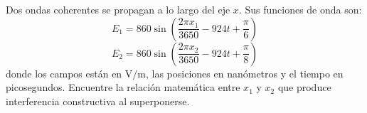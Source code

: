\item Dos ondas coherentes se propagan a lo largo del eje $x$. Sus funciones de onda son:
$$ E_1 = 860 \sin\left( \frac{2\pi x_1}{3650} - 924 t + \frac{\pi}{6} \right) $$
$$ E_2 = 860 \sin\left( \frac{2\pi x_2}{3650} - 924 t + \frac{\pi}{8} \right) $$
donde los campos están en $\text{V/m}$, las posiciones en nanómetros y el tiempo en picosegundos. Encuentre la relación matemática entre $x_1$ y $x_2$ que produce interferencia constructiva al superponerse.